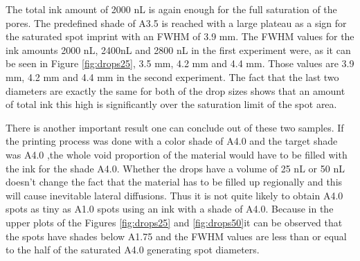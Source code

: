  The total ink amount of 2000 nL is again enough for the full saturation of the pores. The predefined shade of A3.5 is reached with a large plateau as a sign for the saturated spot imprint with an FWHM of 3.9 mm. The FWHM values for the ink amounts 2000 nL, 2400nL and 2800 nL in the first experiment were, as it can be seen in Figure \ref{fig:drops25}, 3.5 mm, 4.2 mm and 4.4 mm. Those values are 3.9 mm, 4.2 mm and 4.4 mm in the second experiment. The fact that the last two diameters are exactly the same for both of the drop sizes shows that an amount of total ink this high is significantly over the saturation limit of the spot area. 
 
 There is another important result one can conclude out of these two samples. If the printing process was done with a color shade of A4.0 and the target shade was A4.0 ,the whole void proportion of the material would have to be filled with the ink for the shade A4.0. Whether the drops have a volume of 25 nL or 50 nL doesn't change the fact that the material has to be filled up regionally and this will cause inevitable  lateral diffusions. Thus it is not quite likely to obtain A4.0 spots as tiny as A1.0 spots using an ink with a shade of A4.0. Because in the upper plots of the Figures \ref{fig:drops25} and \ref{fig:drops50}it can be observed that the spots have shades below A1.75 and the FWHM values are less than or equal to the half of the saturated A4.0 generating spot diameters.
